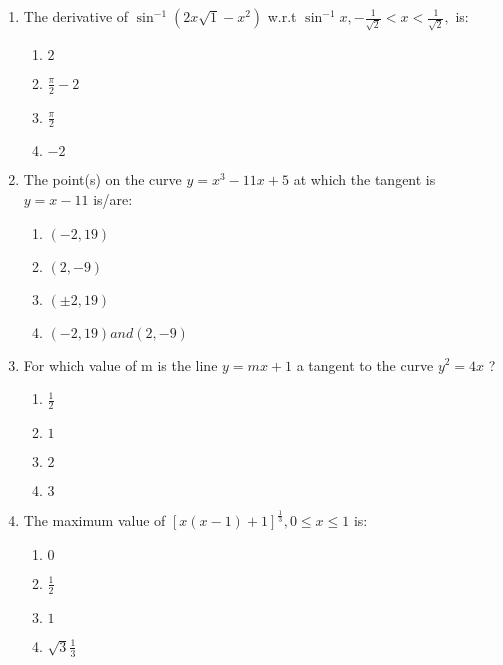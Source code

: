 \documentclass{article}
\begin{document}
\begin{enumerate}
\item The derivative of $ \sin^{-1} (2x \sqrt 1 - x^2) $ w.r.t $ \sin^{-1} x,  -\frac{1}{\sqrt 2 } < x < \frac{1}{\sqrt 2},$ is:
  
  	\begin{enumerate}
    	\item $ 2 $
    	\item $ \frac{\pi}{2} -2 $
    	\item $ \frac{\pi}{2} $
    	\item $ -2 $
  	\end{enumerate}

\item The point(s) on the curve  $ y = x^3 - 11x + 5 $ at which the tangent is $ y = x - 11 $ is/are:
  
  	\begin{enumerate}
    	\item $ (-2, 19)$
    	\item $ ( 2, -9)$
    	\item $ (\pm 2, 19) $
    	\item $ (-2 , 19) and (2, -9) $
  	\end{enumerate}

\item For which value of m is the line  $ y = mx + 1 $ a tangent to the curve $ y^2 = 4x $ ?
  
  	\begin{enumerate}
    	\item $ \frac{1}{2} $
    	\item $ 1 $
    	\item $ 2 $
    	\item $ 3 $
  	\end{enumerate}

\item The maximum value  of $ [x(x - 1) + 1]^\frac{1}{3},  0 \le x \le 1 $ is:
  
  	\begin{enumerate}
    	\item $0$
    	\item $\frac{1}{2}$
    	\item $1$
    	\item $\sqrt3  \frac{1}{3}$
  	\end{enumerate}

\end{enumerate}
\end{document}
